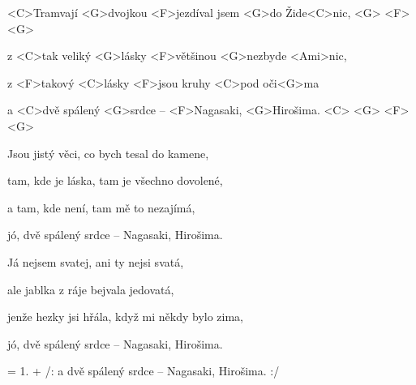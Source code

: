 

\zs
<C>Tramvají <G>dvojkou <F>jezdíval jsem <G>do Žide<C>nic, <G> <F> <G>

z <C>tak veliký <G>lásky <F>většinou <G>nezbyde <Ami>nic,

z <F>takový <C>lásky <F>jsou kruhy <C>pod oči<G>ma

a <C>dvě spálený <G>srdce -- <F>Nagasaki, <G>Hirošima. <C> <G> <F> <G>
\ks

\zs
Jsou jistý věci, co bych tesal do kamene,

tam, kde je láska, tam je všechno dovolené,

a tam, kde není, tam mě to nezajímá,

jó, dvě spálený srdce -- Nagasaki, Hirošima.
\ks

\zs
Já nejsem svatej, ani ty nejsi svatá,

ale jablka z ráje bejvala jedovatá,

jenže hezky jsi hřála, když mi někdy bylo zima,

jó, dvě spálený srdce -- Nagasaki, Hirošima.
\ks

\zs
= 1. + /: a dvě spálený srdce -- Nagasaki, Hirošima. :/
\ks

\kp

